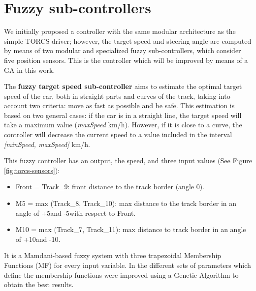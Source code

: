 \documentclass[10pt,journal,compsoc]{IEEEtran}
\begin{document}

\section{Fuzzy sub-controllers}
\label{sec:subcontrollers}

We initially proposed a controller \cite{salem_evo17} with the same modular architecture as the simple TORCS driver; however, the target speed and
steering angle are computed by means of two modular and specialized
fuzzy sub-controllers, which consider five position sensors. This is
the controller which will be improved by means of a GA in this
work.

The \textbf{fuzzy target speed sub-controller} aims to estimate the
optimal target speed of the car, both in straight parts and curves of
the track, taking into account two criteria: move as fast as possible
and be safe. This estimation is based on two general cases: if the car
is in a straight line, the target speed will take a maximum value
(\textit{maxSpeed} km/h). However, if it is close to a curve, the
controller will decrease the current speed to a value included in the
interval \textit{[minSpeed, maxSpeed]} km/h. 

This fuzzy controller has an output, the speed, and three input values (See Figure \ref{fig:torcs-sensors}):
\begin{itemize}
	\item Front = Track\_9: front distance to the track border (angle 0\textdegree).  
	\item M5 = max (Track\_8, Track\_10): max distance to the track border in an angle of +5\textdegree and -5\textdegree with respect to Front.
	\item M10 = max (Track\_7, Track\_11): max distance to track border in an angle of +10\textdegree and -10\textdegree.
\end{itemize}

It is a Mamdani-based fuzzy system \cite{iancu2012} with three
trapezoidal Membership Functions (MF) for every input variable. 
In \cite{salem_evo18} the different sets of parameters which define the membership functions were improved using a Genetic Algorithm to obtain the best results.
\end{document}
